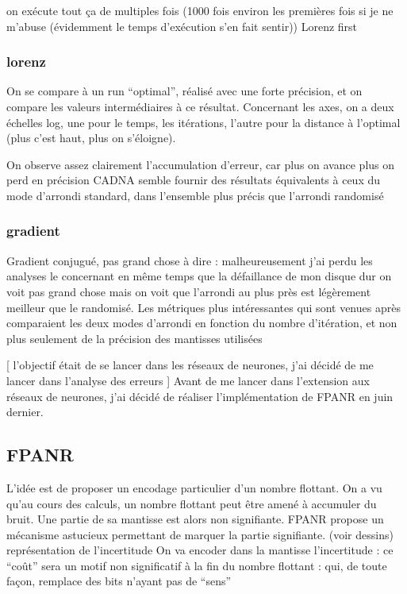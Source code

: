 \documentclass[a4paper,11pt]{article}
\begin{document}
on exécute tout ça de multiples fois (1000 fois environ les premières fois si je ne m’abuse (évidemment le temps d’exécution s’en fait sentir))
Lorenz first

\subsubsection{lorenz}
On se compare à un run “optimal”, réalisé avec une forte précision, et on compare les valeurs intermédiaires à ce résultat.
Concernant les axes, on a deux échelles log, une pour le temps, les itérations, l’autre pour la distance à l’optimal (plus c’est haut, plus on s’éloigne).

On observe assez clairement l’accumulation d’erreur, car plus on avance plus on perd en précision 
CADNA semble fournir des résultats équivalents à ceux du mode d’arrondi standard, dans l’ensemble plus précis que l’arrondi randomisé

\subsubsection{gradient}
Gradient conjugué, pas grand chose à dire : malheureusement j’ai perdu les analyses le concernant en même temps que la défaillance de mon disque dur
on voit pas grand chose mais on voit que l’arrondi au plus près est légèrement meilleur que le randomisé.
Les métriques plus intéressantes qui sont venues après comparaient les deux modes d’arrondi en fonction du nombre d’itération, et non plus seulement de la précision des mantisses utilisées

[ l’objectif était de se lancer dans les réseaux de neurones, j’ai décidé de me lancer dans l’analyse des erreurs ]
Avant de me lancer dans l’extension aux réseaux de neurones, j’ai décidé de réaliser l’implémentation de FPANR en juin dernier.

\subsection{ FPANR }
L’idée est de proposer un encodage particulier d’un nombre flottant.
On a vu qu’au cours des calculs, un nombre flottant peut être amené à accumuler du bruit. Une partie de sa mantisse est alors non signifiante.
FPANR propose un mécanisme astucieux permettant de marquer la partie signifiante. (voir dessins) représentation de l’incertitude
On va encoder dans la mantisse l’incertitude : ce “coût” sera un motif non significatif à la fin du nombre flottant : qui, de toute façon, remplace des bits n’ayant pas de “sens”
\end{document}
